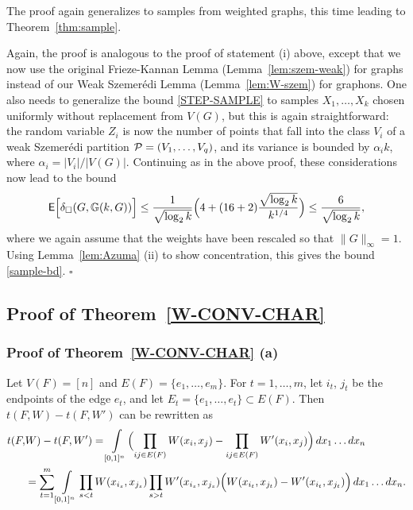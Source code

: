 \documentclass[12pt]{article}
\numberwithin{equation}{section}
\def\E{{\sf E}}
\def\RandG{{\mathbb G}}
\def\PP{{\cal P}}\def\QQ{{\cal Q}}\def\RR{{\cal R}}
\begin{document}
The proof again generalizes
to samples from weighted graphs, this time leading to
Theorem~\ref{thm:sample}.

{ Again, the proof is analogous to the proof of
statement (i) above, except that we now use the original Frieze-Kannan Lemma
(Lemma~\ref{lem:szem-weak}) for graphs instead of our Weak
Szemer\'edi Lemma (Lemma~\ref{lem:W-szem}) for graphons.  One also
needs to generalize the bound \eqref{STEP-SAMPLE} to samples
$X_1,\dots,X_k$ chosen uniformly without replacement from $V(G)$, but
this is again straightforward: the random variable $Z_i$ is now the
number of points that fall into the class $V_i$ of a weak Szemer\'edi
partition $\PP=(V_1,\dots,V_q)$, and its variance is bounded by
$\alpha_i k$, where $\alpha_i=|V_i|/|V(G)|$. Continuing as in the
above proof, these considerations now lead to the bound
\begin{equation}
\label{E-G[X]-sample-bound}
\E\Bigl[\delta_\square(G,\RandG(k,G))\Bigr]\leq
\frac{1}{\sqrt{\log_2 k}} \Bigl(4+ (16+2) \frac{\sqrt{\log_2
k}}{k^{1/4}}\Bigr) \leq\frac{6}{\sqrt{\log_2 k}},
\end{equation}
where we again assume that the weights have been rescaled so that
$\|G\|_\infty=1$. Using Lemma~\ref{lem:Azuma} (ii) to show
concentration, this gives the bound \eqref{sample-bd}.
}
\hfill$\square$


\subsection{Proof of Theorem~\ref{W-CONV-CHAR}}
\label{sec:proof-main-W}

\subsubsection{Proof of Theorem~\ref{W-CONV-CHAR} (a)}
\label{HOMDIST}

Let $V(F)=[n]$ and $E(F)=\{e_1,\dots,e_m\}$. For $t=1,\dots, m$, let
$i_t$, $j_t$ be the endpoints of the edge $e_t$, and let
$E_t=\{e_1,\dots,e_t\}\subset E(F)$. Then $t(F,W)-t(F,W')$ can be
rewritten as
\begin{align}
t(F,&W)-t(F,W')=\int\limits_{[0,1]^n} \Bigl(\prod_{ij\in E(F)}
W(x_i,x_j)-\prod_{ij\in E(F)} W'(x_i,x_j)\Bigr)\,dx_1\dots dx_n
\nonumber\\
&=\sum_{t=1}^{m} \int\limits_{[0,1]^n} \prod_{s<t} W(x_{i_s},x_{j_s})
\prod_{s>t}W'(x_{i_s},x_{j_s}) \Bigl(W(x_{i_t},x_{j_t})-
W'(x_{i_t},x_{j_t})\Bigr)\,dx_1\dots dx_n. \label{TELESCOPE}
\end{align}
\end{document}
